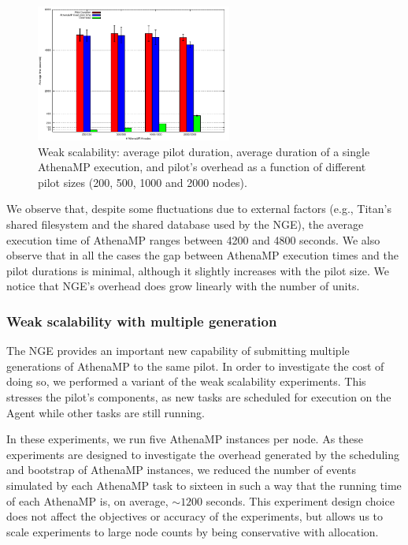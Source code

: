 \begin{figure}[!htb]
        \includegraphics[height=4.5cm,width=\columnwidth]{./figures/NGE/weak1.pdf}
    \caption{Weak scalability: average pilot duration, average  duration of a
    single AthenaMP execution, and pilot's overhead as a function of different pilot sizes (200, 500, 1000 and 2000 nodes).}
\label{fig:weakScal1a}
\end{figure}

We observe that, despite some fluctuations due to external factors (e.g.,
Titan's shared filesystem and the shared database used by the NGE), the average
execution time of AthenaMP  ranges between 4200 and 4800 seconds.  We  also
observe that in all the cases the gap between AthenaMP execution times and the
pilot durations is minimal, although it slightly increases with the pilot size.
We  notice that NGE's overhead does grow linearly with the number of units.


\subsubsection{Weak scalability with multiple generation }

The NGE provides an important new capability of submitting multiple generations
of AthenaMP to the same pilot. In order to investigate the cost of doing so, we
performed a variant of the weak scalability experiments. This stresses the
pilot's components, as new tasks are scheduled for execution on the Agent while
other tasks are still running.


In these experiments, we run five AthenaMP instances per node.  As these
experiments are designed to investigate the overhead generated by the scheduling
and bootstrap of AthenaMP instances, we reduced the number of events simulated
by each AthenaMP task to sixteen in such a way that the running time of each
AthenaMP is, on average, $\sim 1200$ seconds. This experiment design choice does
not affect the  objectives or accuracy of the experiments, but allows us to
scale experiments to large node counts by being conservative with allocation.

